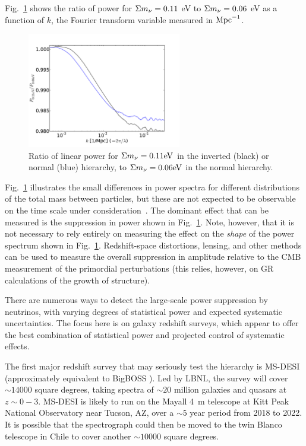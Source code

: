 Fig.~\ref{fig:powerratio} shows the
ratio of power for $\Sigma m_\nu=0.11$ eV to $\Sigma m_\nu=0.06$ eV as a function of 
$k$, the Fourier transform variable measured in ${\rm Mpc}^{-1}$.
\begin{figure}[bp]
\vspace{-0.6cm}
  \centering
\includegraphics[width=0.6\textwidth]{PM/neutrinosCAMB.pdf}
\vspace{-0.2cm}
\caption{
Ratio of linear power for $\Sigma m_\nu=0.11 {\rm eV}$ in the inverted (black) or
normal (blue) hierarchy, to $\Sigma m_\nu=0.06{\rm eV}$ in the normal hierarchy.
}
\label{fig:powerratio}
\end{figure}
Fig.~\ref{fig:powerratio} illustrates the small differences in power spectra for different 
distributions of
the total mass between particles, but these are not expected to be observable
on the time scale under consideration~\cite{2006PhRvD..73l3501S}.
The dominant effect that can be measured is the suppression in power shown
in Fig.~\ref{fig:powerratio}. Note, however, that it is not necessary to rely 
entirely on measuring the effect on the {\it shape} of the power spectrum shown
in Fig.~\ref{fig:powerratio}. Redshift-space 
distortions, lensing, and other methods can be used to measure the overall 
suppression
in amplitude relative to the CMB measurement of the primordial perturbations 
(this relies, however, on GR calculations of the growth of structure).



There are numerous ways to detect the large-scale power suppression by 
neutrinos, with varying degrees of statistical power and expected 
systematic uncertainties. 
The focus here is on galaxy redshift surveys, which appear to offer the best 
combination of statistical power and projected control of systematic effects.

The first major redshift survey that may seriously test the hierarchy is 
MS-DESI (approximately equivalent to BigBOSS \cite{2011arXiv1106.1706S}). 
Led by LBNL, the survey will cover $\sim 14000$ square 
degrees, 
taking spectra of $\sim 20$ million galaxies and quasars at $z\sim 0-3$. 
MS-DESI is likely to run on the Mayall 4~m telescope at Kitt Peak National 
Observatory near Tucson, AZ, over a $\sim5$ year period from 
2018 to 2022. It is possible that the spectrograph could then be moved to the
twin Blanco telescope in Chile to cover another $\sim 10000$ square degrees.

